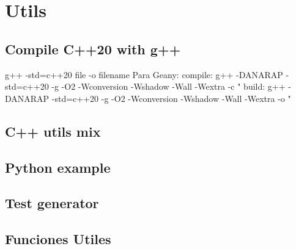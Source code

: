\newpage
\section{Utils}

\subsection{Compile C++20 with g++}
\begin{code}
g++ -std=c++20 {file} -o {filename}
Para Geany:
compile: g++ -DANARAP -std=c++20 -g -O2 -Wconversion -Wshadow -Wall -Wextra -c "%
build:   g++ -DANARAP -std=c++20 -g -O2 -Wconversion -Wshadow -Wall -Wextra -o "%
\end{code}

\subsection{C++ utils mix}


\newpage
\subsection{Python example}

\newpage
\subsection{Test generator}


\newpage
\subsection{Funciones Utiles}

%
%

%
